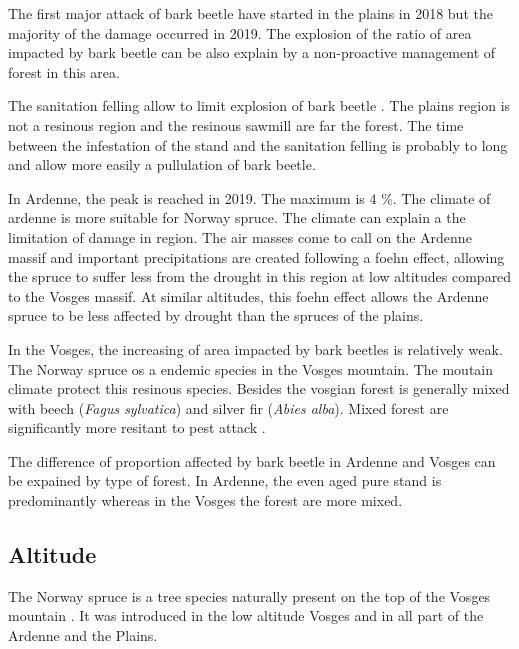 \documentclass[3p,procedia]{elsarticle}
\begin{document}
The first major attack of bark beetle have started in the plains in 2018 but the majority of the damage occurred in 2019. 
The explosion of the ratio of area impacted by bark beetle can be also explain by a non-proactive management of forest in this area.

The sanitation felling allow to limit explosion of bark beetle \citep{stadelmann_effects_2013}.
The plains region is not a resinous region and the resinous sawmill are far the forest. 
The time between the infestation of the stand and the sanitation felling is probably to long and allow more easily a pullulation of bark beetle.

In Ardenne, the peak is reached in 2019. The maximum is 4 \%. The climate of ardenne is more suitable for Norway spruce. 
The climate can explain a the limitation of damage in region. 
The air masses come to call on the Ardenne massif and important precipitations are created following a foehn effect, allowing the spruce to suffer less from the drought in this region at low altitudes compared to the Vosges massif. 
At similar altitudes, this foehn effect allows the Ardenne spruce to be less affected by drought than the spruces of the plains.

In the Vosges, the increasing of area impacted by bark beetles is relatively weak.
The Norway spruce os a endemic species in the Vosges mountain. 
The moutain climate protect this resinous species. 
Besides the vosgian forest is generally mixed with beech (\textit{Fagus sylvatica}) and  silver fir (\textit{Abies alba}). Mixed forest are significantly more resitant to pest attack \citep{jactel_2021}. 

The difference of proportion affected by bark beetle in Ardenne and Vosges can be expained by type of forest.
In Ardenne, the even aged pure stand is predominantly whereas in the Vosges  the forest are more mixed. 

\subsection{Altitude}


The Norway spruce is a tree species naturally present on the top of the Vosges mountain \citep{guinier_trois_1959}. 
It was introduced in the low altitude Vosges and in  all part of the Ardenne and the Plains. 
\end{document}
